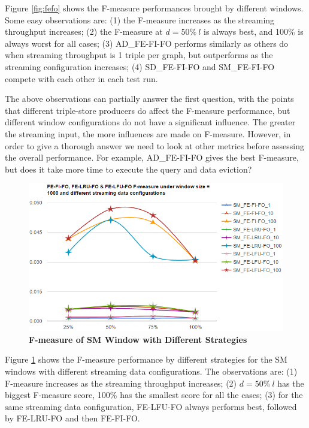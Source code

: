 Figure \ref{fig:fefo} shows the F-measure performances brought by different windows. 
Some easy observations are: 
(1) the F-measure increases as the streaming throughput increases;
(2) the F-measure at $d = 50\%\ l$ is always best, and 100\% is always worst for all cases;
(3) AD\_FE-FI-FO performs similarly as others do when streaming throughput is 1 triple per graph, but outperforms as the streaming configuration increases;
(4) SD\_FE-FI-FO and SM\_FE-FI-FO compete with each other in each test run.

The above observations can partially answer the first question, with the points that different triple-store producers do affect the F-measure performance, but different window configurations do not have a significant influence. 
The greater the streaming input, the more influences are made on F-measure. 
However, in order to give a thorough answer we need to look at other metrics before assessing the overall performance. 
For example, AD\_FE-FI-FO gives the best F-measure, but does it take more time to execute the query and data eviction?

\begin{figure}[!htbp]
	\centering
	\includegraphics[width=5in]{img/4-fds.png}
	\caption{\textbf{F-measure of SM Window with Different Strategies}}
	\label{fig:diff}
\end{figure}

Figure \ref{fig:diff} shows the F-measure performance by different strategies for the SM windows with different streaming data configurations. 
The observations are: 
(1) F-measure increases as the streaming throughput increases;
(2) $d = 50\%\ l$ has the biggest F-measure score, 100\% has the smallest score for all the cases;
(3) for the same streaming data configuration, FE-LFU-FO always performs best, followed by FE-LRU-FO and then FE-FI-FO.

